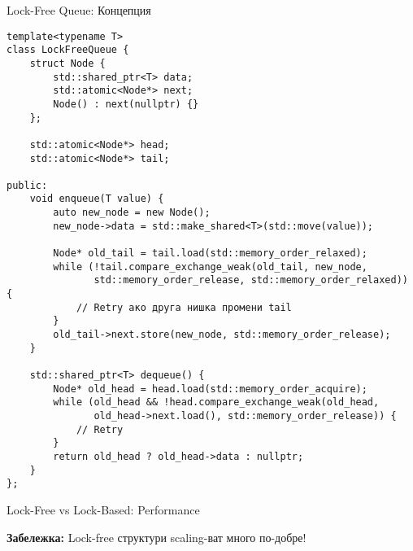 \documentclass[aspectratio=169]{beamer}
\begin{document}
\begin{frame}[fragile]{Lock-Free Queue: Концепция}
\begin{lstlisting}[basicstyle=\ttfamily\tiny]
template<typename T>
class LockFreeQueue {
    struct Node {
        std::shared_ptr<T> data;
        std::atomic<Node*> next;
        Node() : next(nullptr) {}
    };
    
    std::atomic<Node*> head;
    std::atomic<Node*> tail;
    
public:
    void enqueue(T value) {
        auto new_node = new Node();
        new_node->data = std::make_shared<T>(std::move(value));
        
        Node* old_tail = tail.load(std::memory_order_relaxed);
        while (!tail.compare_exchange_weak(old_tail, new_node, 
               std::memory_order_release, std::memory_order_relaxed)) {
            // Retry ако друга нишка промени tail
        }
        old_tail->next.store(new_node, std::memory_order_release);
    }
    
    std::shared_ptr<T> dequeue() {
        Node* old_head = head.load(std::memory_order_acquire);
        while (old_head && !head.compare_exchange_weak(old_head, 
               old_head->next.load(), std::memory_order_release)) {
            // Retry
        }
        return old_head ? old_head->data : nullptr;
    }
};
\end{lstlisting}
\end{frame}

\begin{frame}{Lock-Free vs Lock-Based: Performance}
\begin{center}
\end{center}

\textbf{Забележка:} Lock-free структури scaling-ват много по-добре!
\end{frame}
\end{document}

